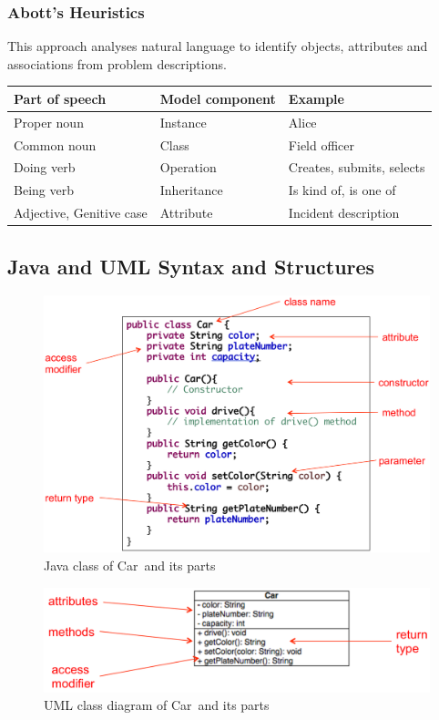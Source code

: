 \subsubsection*{Abott's	Heuristics}
This approach analyses natural language to identify objects, attributes and associations from problem descriptions.
\begin{center}
	\begin{tabular}{l|l|l}
		\textbf{Part of speech} & \textbf{Model component} & \textbf{Example} \\
		\hline
		Proper noun & Instance & Alice \\
		Common noun & Class & Field officer \\
		Doing verb & Operation & Creates, submits, selects \\
		Being verb & Inheritance & Is kind of, is one of \\
		Adjective, Genitive case & Attribute & Incident description
	\end{tabular} 
\end{center}
\newpage

\subsection{Java and UML Syntax and Structures}
\begin{figure}[h!]
	\centering
	\includegraphics[width=\linewidth]{images/oop_java_class}
	\caption{Java class of \glqq Car\grqq \ and its parts}
\end{figure}

\begin{figure}[h!]
	\centering
	\includegraphics[width=\linewidth]{images/oop_uml_class}
	\caption{UML class diagram of \glqq Car\grqq \ and its parts}
\end{figure}

